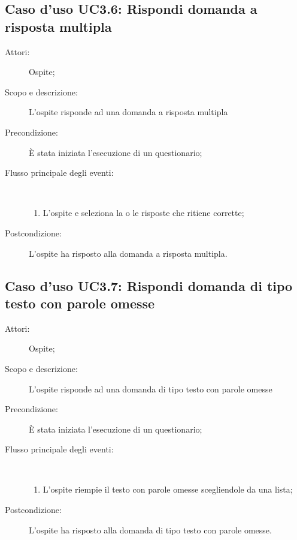 \subsection{Caso d'uso UC3.6: Rispondi domanda a risposta multipla}\begin{description}
	\item[Attori:] Ospite;
	\item[Scopo e descrizione:] L'ospite risponde ad una domanda a risposta multipla
	\item[Precondizione:] È stata iniziata l'esecuzione di un questionario;
	
	\item[Flusso principale degli eventi:] \ 
	\begin{enumerate}
		\item L'ospite e seleziona la o le risposte che ritiene corrette;
		
	\end{enumerate}
	\item[Postcondizione:] L'ospite ha risposto alla domanda a risposta multipla.
\end{description}
\hypertarget{UC3.7}{}
\subsection{Caso d'uso UC3.7: Rispondi domanda di tipo testo con parole omesse}\begin{description}
	\item[Attori:] Ospite;
	\item[Scopo e descrizione:] L'ospite risponde ad una domanda di tipo testo con parole omesse
	\item[Precondizione:] È stata iniziata l'esecuzione di un questionario;
	
	\item[Flusso principale degli eventi:] \ 
	\begin{enumerate}
		\item L'ospite riempie il testo con parole omesse scegliendole da una lista;
		
	\end{enumerate}
	\item[Postcondizione:] L'ospite ha risposto alla domanda di tipo testo con parole omesse.
\end{description}
\hypertarget{UC3.8}{}
